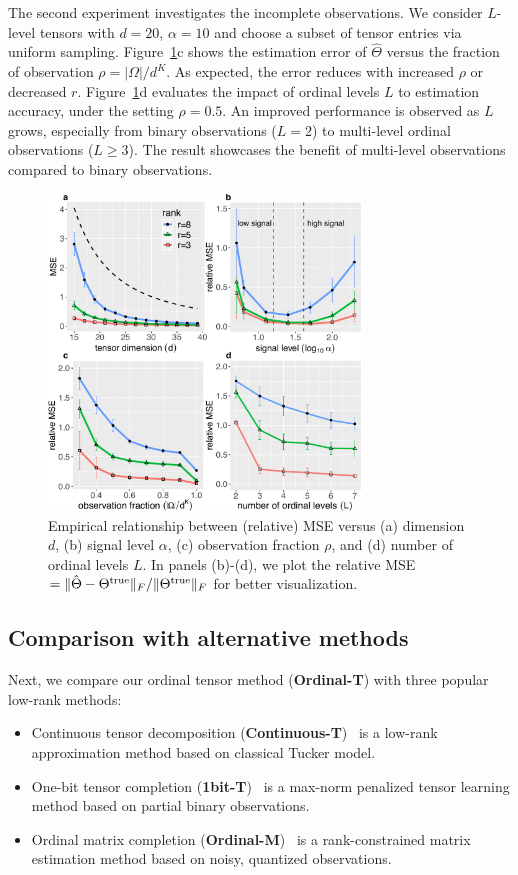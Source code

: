 \documentclass{article}
\theoremstyle{plain}
\theoremstyle{definition}
\begin{document}
The second experiment investigates the incomplete observations. We consider $L$-level tensors with $d=20$, $\alpha=10$ and choose a subset of tensor entries via uniform sampling. Figure~\ref{fig:finite}c shows the estimation error of $\hat \Theta$ versus the fraction of observation $\rho=|\Omega|/d^K$. As expected, the error reduces with increased $\rho$ or decreased $r$. Figure~\ref{fig:finite}d evaluates the impact of ordinal levels $L$ to estimation accuracy, under the setting $\rho=0.5$. An improved performance is observed as $L$ grows, especially from binary observations ($L=2$) to multi-level ordinal observations ($L\geq 3$). The result showcases the benefit of multi-level observations compared to binary observations.

\begin{figure}[http]
\includegraphics[width=8.3cm]{panel.pdf}
\vspace{-.2cm}
\caption{Empirical relationship between (relative) MSE versus (a) dimension $d$, (b) signal level $\alpha$, (c) observation fraction $\rho$, and (d) number of ordinal levels $L$. In panels (b)-(d), we plot the relative MSE $=\lVert\hat \Theta-\Theta^{\mathrm{true}}\rVert_F/\lVert\Theta^{\mathrm{true}}\rVert_F$ for better visualization.}
\label{fig:finite}
\vspace{-.3cm}
\end{figure}


\subsection{Comparison with alternative methods}
Next, we compare our ordinal tensor method ({\bf Ordinal-T}) with three popular low-rank methods:

\begin{itemize}[itemsep=0pt,topsep=0pt,leftmargin=*,partopsep=0pt]
\item Continuous tensor decomposition ({\bf Continuous-T})~\cite{acar2010scalable} is a low-rank approximation method based on classical Tucker model.
\item One-bit tensor completion ({\bf 1bit-T})~\cite{ghadermarzy2018learning} is a max-norm penalized tensor learning method based on partial binary observations.
\item Ordinal matrix completion ({\bf Ordinal-M})~\cite{bhaskar2016probabilistic} is a rank-constrained matrix estimation method based on noisy, quantized observations.
\end{itemize}
\end{document}
